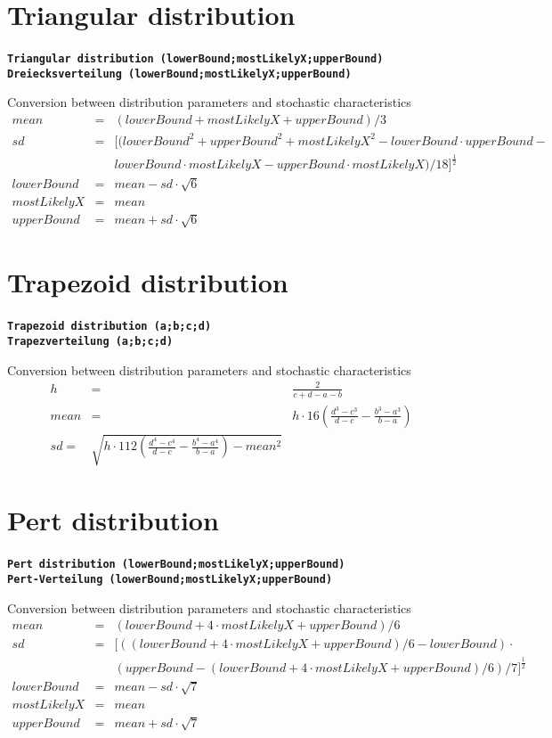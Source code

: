 \documentclass{svmono}
\def\cm#1{\textbf{\texttt{#1}}}
\begin{document}
\section*{Triangular distribution}
\cm{Triangular distribution (lowerBound;mostLikelyX;upperBound)}~\\
\cm{Dreiecksverteilung (lowerBound;mostLikelyX;upperBound)}

Conversion between distribution parameters and stochastic characteristics
\begin{eqnarray*}
mean&=&(lowerBound+mostLikelyX+upperBound)/3\\
sd&=&\Big[(lowerBound^2+upperBound^2+mostLikelyX^2-lowerBound\cdot upperBound-\\
~&~&lowerBound\cdot mostLikelyX-upperBound\cdot mostLikelyX)/18\Big]^{\frac{1}{2}}\\
lowerBound&=&mean-sd\cdot\sqrt{6}\\
mostLikelyX&=&mean\\
upperBound&=&mean+sd\cdot\sqrt{6}
\end{eqnarray*}





\section*{Trapezoid distribution}
\cm{Trapezoid distribution (a;b;c;d)}~\\
\cm{Trapezverteilung (a;b;c;d)}

Conversion between distribution parameters and stochastic characteristics
\begin{eqnarray*}
h&=&\frac{2}{c+d-a-b}\\
mean&=&h\cdot{1}{6}\left(\frac{d^3-c^3}{d-c}-\frac{b^3-a^3}{b-a}\right)\\
sd=&\sqrt{h\cdot{1}{12}\left(\frac{d^4-c^4}{d-c}-\frac{b^4-a^4}{b-a}\right)-mean^2}
\end{eqnarray*}





\section*{Pert distribution}
\cm{Pert distribution (lowerBound;mostLikelyX;upperBound)}~\\
\cm{Pert-Verteilung (lowerBound;mostLikelyX;upperBound)}

Conversion between distribution parameters and stochastic characteristics
\begin{eqnarray*}
mean&=&(lowerBound+4\cdot mostLikelyX+upperBound)/6\\
sd&=&\Big[((lowerBound+4\cdot mostLikelyX+upperBound)/6-lowerBound)\cdot\\
~&~&(upperBound-(lowerBound+4\cdot mostLikelyX+upperBound)/6)/7\Big]^{\frac{1}{2}}\\
lowerBound&=&mean-sd\cdot\sqrt{7}\\
mostLikelyX&=&mean\\
upperBound&=&mean+sd\cdot\sqrt{7}
\end{eqnarray*}
\end{document}
